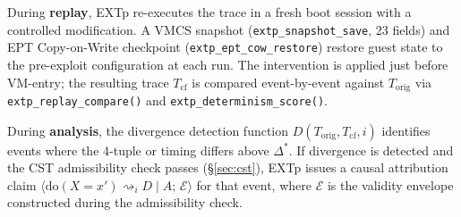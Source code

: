 \documentclass[conference]{IEEEtran}
\newcommand{\Korig}{T_\text{orig}}
\newcommand{\Tcf}{T_\text{cf}}
\newcommand{\Dstar}{\Delta^{*}}
\newcommand{\dox}[1]{\text{do}(X{=}#1)}
\begin{document}
During \textbf{replay}, EXTp re-executes the trace in a fresh boot
session with a controlled modification. A VMCS snapshot
(\texttt{extp\_snapshot\_save}, 23 fields) and EPT Copy-on-Write
checkpoint (\texttt{extp\_ept\_cow\_restore}) restore guest state to
the pre-exploit configuration at each run. The intervention is
applied just before VM-entry; the resulting trace $\Tcf$ is compared
event-by-event against $\Korig$ via \texttt{extp\_replay\_compare()}
and \texttt{extp\_determinism\_score()}.

During \textbf{analysis}, the divergence detection function
$D(\Korig, \Tcf, i)$ identifies events where the 4-tuple or timing
differs above $\Dstar$. If divergence is detected and the CST
admissibility check passes (\S\ref{sec:cst}), EXTp issues a causal
attribution claim $\langle \dox{x'} \rightsquigarrow_i D \mid A;\,
\mathcal{E} \rangle$ for that event, where $\mathcal{E}$ is the
validity envelope constructed during the admissibility check.
\end{document}
